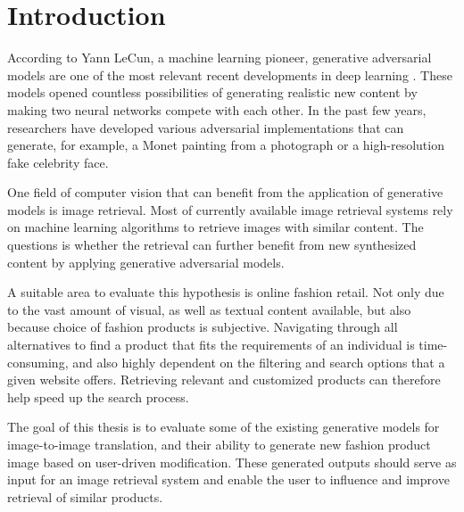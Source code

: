 \documentclass[12pt]{report}
\begin{document}


\pagestyle{plain}
\renewcommand{\baselinestretch}{0.75}\normalsize
\tableofcontents
\renewcommand{\baselinestretch}{1.0}\normalsize
\clearpage


\pagestyle{fancy}
\fancyhf{}
\lhead{\slshape\nouppercase{\rightmark}}
\rhead{ \thepage}
\renewcommand{\headrulewidth}{.5pt}
\chapter{Introduction}
According to Yann LeCun, a machine learning pioneer, generative adversarial models are one of the most relevant recent developments in deep learning \cite{yann_lecun_what_2016}. These models opened countless possibilities of generating realistic new content by making two neural networks compete with each other. In the past few years, researchers have developed various adversarial implementations that can generate, for example, a Monet painting from a photograph or  a high-resolution fake celebrity face.

One field of computer vision that can benefit from the application of generative models is image retrieval. Most of currently available image retrieval systems rely on machine learning algorithms to retrieve images with similar content.  The questions is whether the retrieval can further benefit from new synthesized content by applying generative adversarial models.

A suitable area to evaluate this hypothesis is online fashion retail. Not only due to the vast amount of visual, as well as textual content available, but also because choice of fashion products is subjective. Navigating through all alternatives to find a product that fits the requirements of an individual is time-consuming, and also highly dependent on the filtering and search options that a given website offers. Retrieving relevant and customized products can therefore help speed up the search process.

The goal of this thesis is to evaluate some of the existing generative models for image-to-image translation, and their ability to generate new fashion product image based on user-driven modification. These generated outputs should serve as input for an image retrieval system and enable the user to influence and improve retrieval of similar products.
\end{document}
